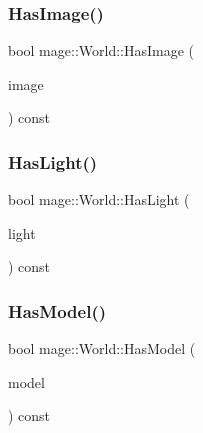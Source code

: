 \hypertarget{classmage_1_1_world_a54991358a01f0598ff11fd7a8a126897}{}\label{classmage_1_1_world_a54991358a01f0598ff11fd7a8a126897} 
\subsubsection{\texorpdfstring{Has\+Image()}{HasImage()}}
{\footnotesize\ttfamily bool mage\+::\+World\+::\+Has\+Image (\begin{DoxyParamCaption}\item[{const \hyperlink{namespacemage_a1e01ae66713838a7a67d30e44c67703e}{Shared\+Ptr}$<$ \hyperlink{classmage_1_1_sprite_image}{Sprite\+Image} $>$}]{image }\end{DoxyParamCaption}) const}

\hypertarget{classmage_1_1_world_ac76eb3df75c68ec28b7a9db9b0576171}{}\label{classmage_1_1_world_ac76eb3df75c68ec28b7a9db9b0576171} 
\subsubsection{\texorpdfstring{Has\+Light()}{HasLight()}}
{\footnotesize\ttfamily bool mage\+::\+World\+::\+Has\+Light (\begin{DoxyParamCaption}\item[{const \hyperlink{namespacemage_a1e01ae66713838a7a67d30e44c67703e}{Shared\+Ptr}$<$ \hyperlink{classmage_1_1_point_light}{Point\+Light} $>$}]{light }\end{DoxyParamCaption}) const}

\hypertarget{classmage_1_1_world_a821d420241b2a94502b20e24595490df}{}\label{classmage_1_1_world_a821d420241b2a94502b20e24595490df} 
\subsubsection{\texorpdfstring{Has\+Model()}{HasModel()}}
{\footnotesize\ttfamily bool mage\+::\+World\+::\+Has\+Model (\begin{DoxyParamCaption}\item[{const \hyperlink{namespacemage_a1e01ae66713838a7a67d30e44c67703e}{Shared\+Ptr}$<$ \hyperlink{classmage_1_1_model}{Model} $>$}]{model }\end{DoxyParamCaption}) const}

